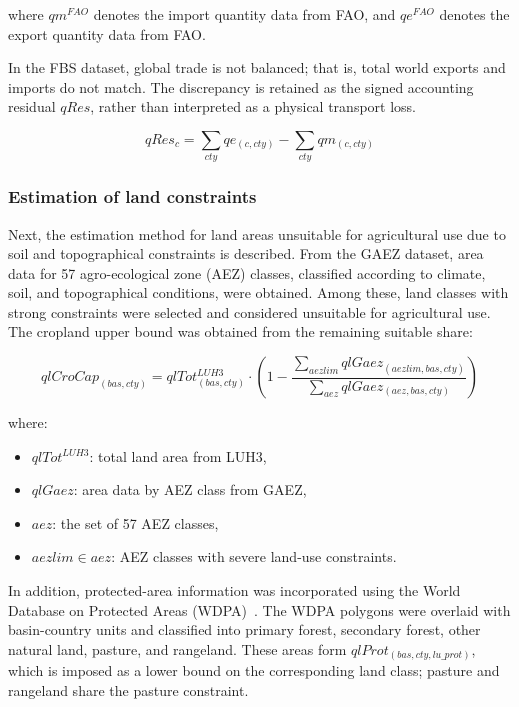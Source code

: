where \( qm^{FAO} \) denotes the import quantity data from FAO,
and \( qe^{FAO} \) denotes the export quantity data from FAO.

In the FBS dataset, global trade is not balanced; that is, total world exports and imports do not match. The discrepancy is retained as the signed accounting residual \(qRes\), rather than interpreted as a physical transport loss.

\begin{equation}
qRes_{c} = \sum_{cty} qe_{(c,cty)} - \sum_{cty} qm_{(c,cty)}
\end{equation}



\subsubsection{Estimation of land constraints}

Next, the estimation method for land areas unsuitable for agricultural use 
due to soil and topographical constraints is described.  
From the GAEZ dataset, area data for 57 agro-ecological zone (AEZ) classes, 
classified according to climate, soil, and topographical conditions, 
were obtained.  
Among these, land classes with strong constraints were selected 
and considered unsuitable for agricultural use.  
The cropland upper bound was obtained from the remaining suitable share:

\begin{equation}
qlCroCap_{(bas,cty)} =
qlTot^{LUH3}_{(bas,cty)} \cdot
\left(1-\frac{\sum_{aezlim} qlGaez_{(aezlim,bas,cty)}}
{\sum_{aez} qlGaez_{(aez,bas,cty)}}\right)
\end{equation}

where:
\begin{itemize}
\item \( qlTot^{LUH3} \): total land area from LUH3,
\item \( qlGaez \): area data by AEZ class from GAEZ,
\item \( aez \): the set of 57 AEZ classes,
\item \( aezlim \in aez \): AEZ classes with severe land-use constraints.
\end{itemize}

In addition, protected-area information was incorporated using the World Database on Protected Areas (WDPA)~\cite{iucnUNEPWCMCWorldDatabase2025}.  
The WDPA polygons were overlaid with basin-country units and classified into primary forest, secondary forest, other natural land, pasture, and rangeland. These areas form \(qlProt_{(bas,cty,lu\_prot)}\), which is imposed as a lower bound on the corresponding land class; pasture and rangeland share the pasture constraint.

